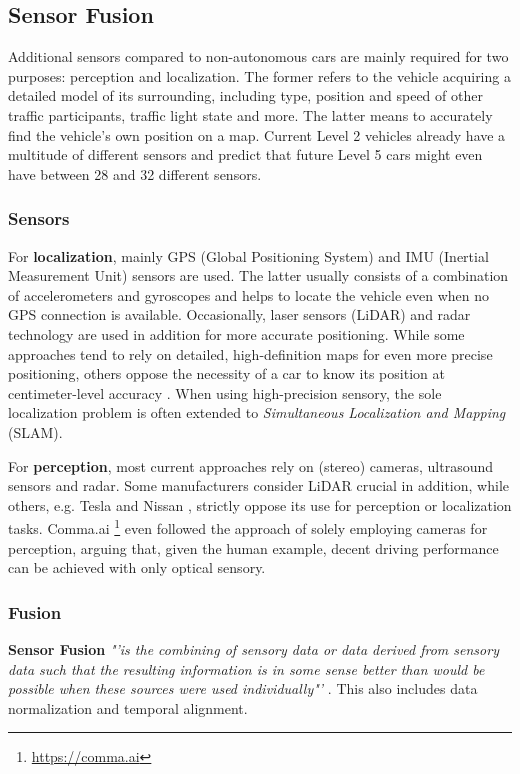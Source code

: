 \subsection{Sensor Fusion}
\label{subsec:background:sensor_fusion}
Additional sensors compared to non-autonomous cars are mainly required for two purposes: perception and localization. The former refers to the vehicle acquiring a detailed model of its surrounding, including type, position and speed of other traffic participants, traffic light state and more. The latter means to accurately find the vehicle's own position on a map. Current Level 2 vehicles already have a multitude of different sensors and \cite{Frost&SulivanConsulting2018} predict that future Level 5 cars might even have between 28 and 32 different sensors. 

\subsubsection{Sensors}
For \textbf{localization}, mainly GPS (Global Positioning System) and IMU (Inertial Measurement Unit) sensors are used. The latter usually consists of a combination of accelerometers and gyroscopes and helps to locate the vehicle even when no GPS connection is available. Occasionally, laser sensors (LiDAR) and radar technology are used in addition for more accurate positioning. While some approaches tend to rely on detailed, high-definition maps for even more precise positioning, others oppose the necessity of a car to know its position at centimeter-level accuracy \cite{Friedman2019}. When using high-precision sensory, the sole localization problem is often extended to \textit{Simultaneous Localization and Mapping} (SLAM).

For \textbf{perception}, most current approaches rely on (stereo) cameras, ultrasound sensors and radar. Some manufacturers consider LiDAR crucial in addition, while others, e.g. Tesla and Nissan \cite{McKinseyCenterforFutureMobility2019}, strictly oppose its use for perception or localization tasks. Comma.ai \footnote{\url{https://comma.ai}} even followed the approach of solely employing cameras for perception, arguing that, given the human example, decent driving performance can be achieved with only optical sensory. 

\subsubsection{Fusion}
\textbf{Sensor Fusion} \textit{"'is the combining of sensory data or data derived from sensory data such that the resulting information is in some sense better than would be possible when these sources were used individually"'} \cite{Elmenreich2002}. This also includes data normalization and temporal alignment.

